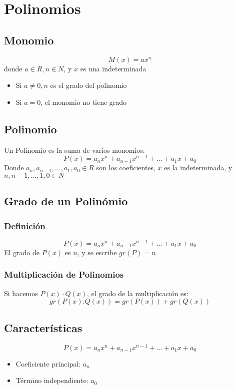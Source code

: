 \section{Polinomios}
\subsection{Monomio}
   \[M(x)=ax^n\] donde $a \in R, n \in N$, y $x$ es una indeterminada
   \begin{itemize}
    \item Si $a \neq 0, n$ es el grado del polinomio
    \item Si $a=0$, el monomio no tiene grado
   \end{itemize}
\subsection{Polinomio}
   Un Polinomio es la suma de varios monomios:
   \[P(x)=a_n x^n + a_{n-1} x^{n-1}+ \ldots + a_1 x + a_0 \]
   Donde $ a_n, a_{n-1}, \ldots, a_1, a_0 \in R$ son los coeficientes,
   $x$ es la indeterminada, y 
   $n, n-1, \ldots, 1, 0 \in N$ 
  
  \subsection{Grado de un Polin\'omio}
      \subsubsection{Definici\'on}
      \[P(x)=a_n x^n + a_{n-1} x^{n-1}+ \ldots + a_1 x + a_0 \]   
      El grado de $P(x)$ es $n$, y se escribe $gr(P)=n$
            
      \subsubsection{Multiplicaci\'on de Polinomios}
      Si hacemos $P(x) \cdot Q(x)$, el grado de la multiplicaci\'on es:
      \[ gr(P(x). Q(x))=gr(P(x))+ gr(Q(x))\]   
      
   \subsection{Caracter\'isticas}
      \[P(x)=a_n x^n + a_{n-1} x^{n-1}+ \ldots + a_1 x + a_0 \]   
   \begin{itemize}
    \item Coeficiente principal: $a_n$
    \item T\'ermino independiente: $a_0$
   \end{itemize}
   
